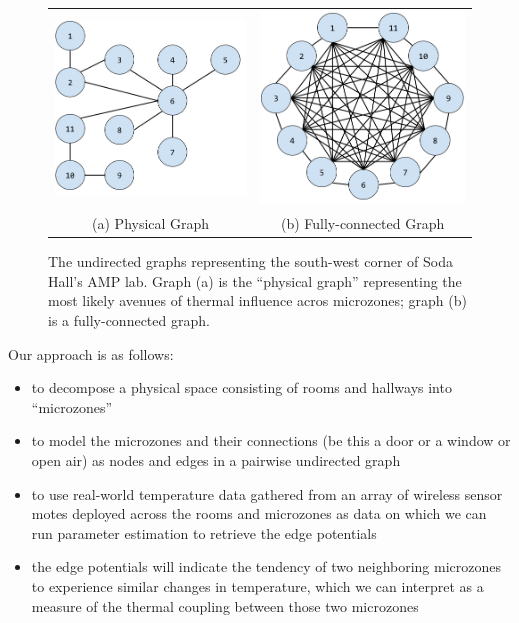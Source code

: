 \begin{figure}
\centering
\begin{tabular}{cc}
\includegraphics[width=.4\linewidth]{figs/SodaEdgeGraph} & \includegraphics[width=.4\linewidth]{figs/SodaFullEdgeGraph} \\
(a) Physical Graph  & (b) Fully-connected Graph \\[6pt]
\end{tabular}
\caption{The undirected graphs representing the south-west corner of Soda Hall's AMP lab. Graph (a) is the ``physical graph'' representing the most likely avenues of thermal influence acros microzones; graph (b) is a fully-connected graph.}
\label{fig:soda_edges}
\end{figure}

Our approach is as follows:

\begin{itemize}[noitemsep, nolistsep]
\item to decompose a physical space consisting of rooms and hallways into ``microzones''
\item to model the microzones and their connections (be this a door or a window or open air) as nodes and edges in a pairwise undirected graph
\item to use real-world temperature data gathered from an array of wireless sensor motes deployed across the rooms and microzones as data on which we can run parameter estimation to retrieve the edge potentials
\item the edge potentials will indicate the tendency of two neighboring microzones to experience similar changes in temperature, which we can interpret as a measure of the thermal coupling between those two microzones
\end{itemize}

